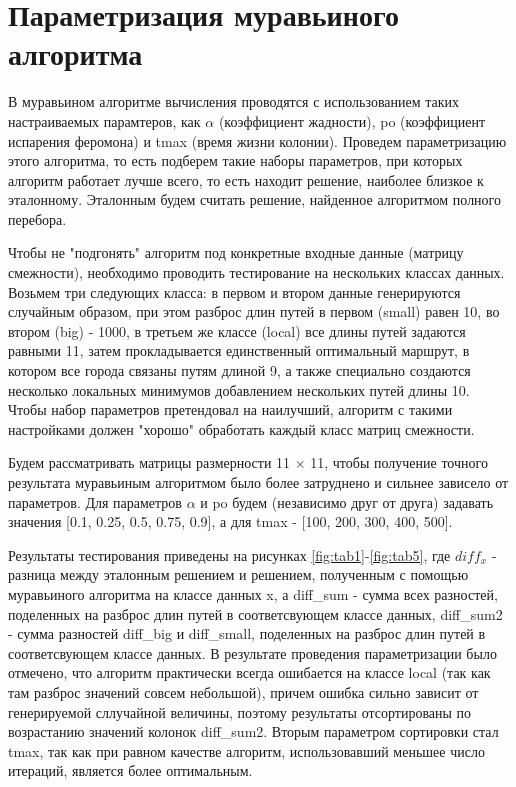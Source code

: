 \section{Параметризация муравьиного алгоритма}

В муравьином алгоритме вычисления проводятся с использованием таких настраиваемых парамтеров, как $\alpha$ (коэффициент жадности), po (коэффициент испарения феромона) и tmax (время жизни колонии). Проведем параметризацию этого алгоритма, то есть подберем такие наборы параметров, при которых алгоритм работает лучше всего, то есть находит решение, наиболее близкое к эталонному. Эталонным будем считать решение, найденное алгоритмом полного перебора. 

Чтобы не "подгонять" алгоритм под конкретные входные данные (матрицу смежности), необходимо проводить тестирование на нескольких классах данных. Возьмем три следующих класса: в первом и втором данные генерируются случайным образом, при этом разброс длин путей в первом (small) равен 10, во втором (big) - 1000, в третьем же классе (local) все длины путей задаются равными 11, затем прокладывается единственный оптимальный маршрут, в котором все города связаны путям длиной 9, а также специально создаются несколько локальных минимумов добавлением нескольких путей длины 10. Чтобы набор параметров претендовал на наилучший, алгоритм с такими настройками должен "хорошо" обработать каждый класс матриц смежности. 
 
Будем рассматривать матрицы размерности 11 × 11, чтобы получение точного результата муравьиным алгоритмом было более затруднено и сильнее зависело от параметров. Для параметров  $\alpha$ и po будем (независимо друг от друга) задавать значения [0.1, 0.25, 0.5, 0.75, 0.9], а для tmax - [100, 200, 300, 400, 500]. 

Результаты тестирования приведены на рисунках \ref{fig:tab1}-\ref{fig:tab5}, где $diff_x$ - разница между эталонным решением и решением, полученным с помощью муравьиного алгоритма на классе данных x, а diff\_sum - сумма всех разностей, поделенных на разброс длин путей в соответсвующем классе данных, diff\_sum2 - сумма разностей diff\_big и diff\_small, поделенных на разброс длин путей в соответсвующем классе данных. В результате проведения параметризации было отмечено, что алгоритм практически всегда ошибается на классе local (так как там разброс значений совсем небольшой), причем ошибка сильно зависит от генерируемой сллучайной величины, поэтому результаты отсортированы по возрастанию значений колонок diff\_sum2. Вторым параметром сортировки стал tmax, так как при равном качестве алгоритм, использовавший меньшее число итераций, является более оптимальным.


